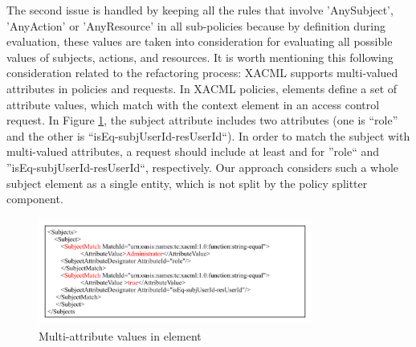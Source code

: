 The second issue is handled by keeping all the rules that involve 'AnySubject', 'AnyAction' or 'AnyResource' in all sub-policies because by definition during 
evaluation, these values are taken into consideration for evaluating all possible values of subjects, actions, and resources. 
It is worth mentioning this following consideration related to the refactoring process:
XACML supports multi-valued attributes in policies and requests. In XACML policies,  elements define a set of attribute values, which match with 
the context element in 
an access control request. In Figure \ref{xacml-match}, the subject attribute includes two attributes (one is ``role'' and the other 
is ``isEq-subjUserId-resUserId``). In order to match the subject with multi-valued attributes, a request should include at least  and  
for ''role`` and ''isEq-subjUserId-resUserId``, respectively.
Our approach considers such a whole subject element as a single entity, which is not split by the policy splitter component.
\begin{figure}[!h]
\begin{center}
\includegraphics[width=9cm, height=3.5cm]{xacml-match}
\caption{Multi-attribute values in  element}
\label{xacml-match}
\end{center}
\end{figure}

